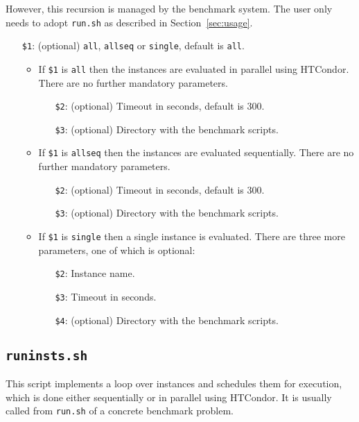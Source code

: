 \documentclass[a4paper]{article}
\begin{document}
		    However, this recursion is managed by the benchmark system.
		    The user only needs to adopt {\tt run.sh} as described in Section~\ref{sec:usage}.
		
		    \medskip{}
		    \begin{itemize}
				\item[{\tt \$1}:] (optional) {\tt all}, {\tt allseq} or {\tt single}, default is {\tt all}.
					\begin {itemize}
						\item If {\tt \$1} is {\tt all} then the instances are evaluated in parallel using HTCondor. There are no further mandatory parameters.
							\begin{itemize}
								\item[{\tt \$2}:] (optional) Timeout in seconds, default is $300$.
								\item[{\tt \$3}:] (optional) Directory with the benchmark scripts.
							\end{itemize}
						\item If {\tt \$1} is {\tt allseq} then the instances are evaluated sequentially. There are no further mandatory parameters.
							\begin{itemize}
								\item[{\tt \$2}:] (optional) Timeout in seconds, default is $300$.
								\item[{\tt \$3}:] (optional) Directory with the benchmark scripts.
							\end{itemize}
						\item If {\tt \$1} is {\tt single} then a single instance is evaluated. There are three more parameters, one of which is optional:
							\begin{itemize}
								\item[{\tt \$2}:] Instance name.
								\item[{\tt \$3}:] Timeout in seconds.
								\item[{\tt \$4}:] (optional) Directory with the benchmark scripts.
							\end{itemize}
					\end{itemize}
		    \end{itemize}
				
		\subsection{\tt runinsts.sh}
		\label{sec:architecture:runinsts}
		
		    This script implements a loop over instances and schedules them for execution,
		    which is done either sequentially or in parallel using HTCondor.
		    It is usually called from {\tt run.sh} of a concrete benchmark problem.
		    
\end{document}
